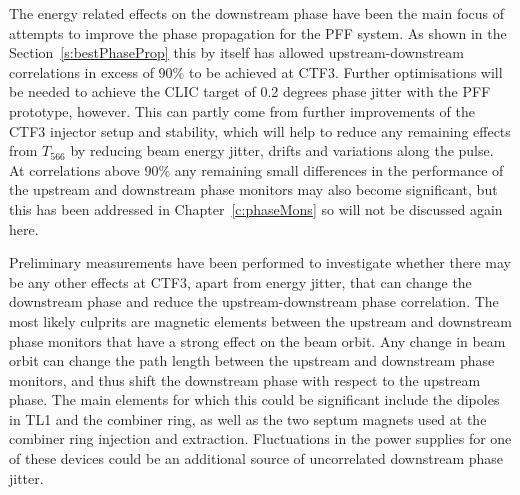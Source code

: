 

The energy related effects on the downstream phase have been the main focus of attempts to improve the phase propagation for the PFF system. As shown in the Section~\ref{s:bestPhaseProp} this by itself has allowed upstream-downstream correlations in excess of 90\% to be achieved at CTF3. Further optimisations will be needed to achieve the CLIC target of 0.2 degrees phase jitter with the PFF prototype, however. This can partly come from further improvements of the CTF3 injector setup and stability, which will help to reduce any remaining effects from \(T_{566}\) by reducing beam energy jitter, drifts and variations along the pulse. At correlations above \(90\%\) any remaining small differences in the performance of the upstream and downstream phase monitors may also become significant, but this has been addressed in Chapter~\ref{c:phaseMons} so will not be discussed again here.

Preliminary measurements have been performed to investigate whether there may be any other effects at CTF3, apart from energy jitter, that can change the downstream phase and reduce the upstream-downstream phase correlation. The most likely culprits are magnetic elements between the upstream and downstream phase monitors that have a strong effect on the beam orbit. Any change in beam orbit can change the path length between the upstream and downstream phase monitors, and thus shift the downstream phase with respect to the upstream phase. The main elements for which this could be significant include the dipoles in TL1 and the combiner ring, as well as the two septum magnets used  at the combiner ring injection and extraction. Fluctuations in the power supplies for one of these devices could be an additional source of uncorrelated downstream phase jitter.

